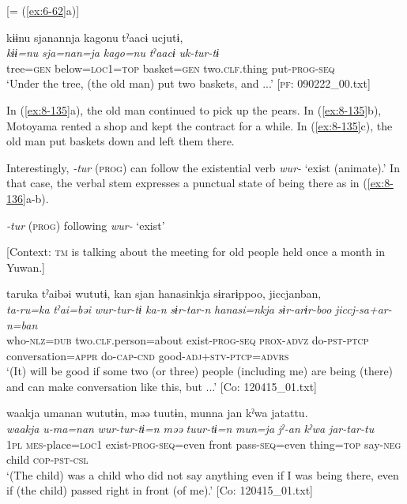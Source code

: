 \ex {}[= (\ref{ex:6-62}a)]

{\TM}
\glll  kɨɨnu  sjanannja  kagonu  tˀaacɨ  ucjutɨ,\\
\textit{kɨɨ=nu}  \textit{sja=nan=ja}  \textit{kago=nu}  \textit{tˀaacɨ}  \textit{uk-tur-tɨ}\\
tree=\textsc{gen}  below=\textsc{loc1}=\textsc{top}  basket=\textsc{gen}  two.\textsc{clf}.thing  put-\textsc{prog}-\textsc{seq}\\
\glt ‘Under the tree, (the old man) put two baskets, and ...’ [\textsc{pf}: 090222\_00.txt]
\z
\z

In (\ref{ex:8-135}a), the old man continued to pick up the pears. In (\ref{ex:8-135}b), Motoyama rented a shop and kept the contract for a while. In (\ref{ex:8-135}c), the old man put baskets down and left them there.

  Interestingly, \textit{-tur} (\textsc{prog}) can follow the existential verb \textit{wur-} ‘exist (animate).’ In that case, the verbal stem expresses a punctual state of being there as in (\ref{ex:8-136}a-b).

\ea\label{ex:8-136}
  \textit{-tur} (\textsc{prog}) following \textit{wur-} ‘exist’

\ea {}[Context: \textsc{tm} is talking about the meeting for old people held once a month in Yuwan.]

{\TM}
\glll  taruka  tˀaibəi  wututɨ,  kan    sjan  hanasinkja  sɨrarɨppoo,  jiccjanban,\\
\textit{ta-ru=ka}  \textit{tˀai=bəi}  \textit{wur-tur-tɨ  ka-n}    \textit{sɨr-tar-n}  \textit{hanasi=nkja}  \textit{sɨr-arɨr-boo}  \textit{jiccj-sa+ar-n=ban}\\
who-\textsc{nlz}=\textsc{dub}  two.\textsc{clf}.person=about  exist-\textsc{prog}-\textsc{seq}  \textsc{prox}-\textsc{advz}  do-\textsc{pst}-\textsc{ptcp}  conversation=\textsc{appr}  do-\textsc{cap}-\textsc{cnd}  good-\textsc{adj}+\textsc{stv}-\textsc{ptcp}=\textsc{advrs}\\
\glt ‘(It) will be good if some two (or three) people (including me) are being (there) and can make conversation like this, but ...’ [Co: 120415\_01.txt]

\ex
{\TM}
\glll  waakja  umanan  wututɨn,  məə   tuutɨn,  munna  jan  kˀwa  jatattu.\\
\textit{waakja}  \textit{u-ma=nan}  \textit{wur-tur-tɨ=n  məə}      \textit{tuur-tɨ=n}  \textit{mun=ja}  \textit{jˀ-an}  \textit{kˀwa}  \textit{jar-tar-tu}\\
1\textsc{pl}  \textsc{mes}-place=\textsc{loc1}  exist-\textsc{prog}-\textsc{seq}=even  front  pass-\textsc{seq}=even  thing=\textsc{top}  say-\textsc{neg}  child  \textsc{cop}-\textsc{pst}-\textsc{csl}\\
\glt ‘(The child) was a child who did not say anything even if I was being there, even if (the child) passed right in front (of me).’ [Co: 120415\_01.txt]
\z
\z

